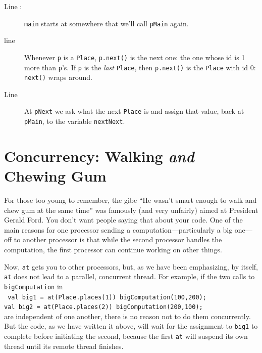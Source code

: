 \begin{description}
\item[Line :] 
{\tt main} starts at somewhere that we'll call {\tt pMain} again.    
\item[line ] 
Whenever {\tt p} is a {\tt Place}, 
{\tt p.next()} is the next one: the one whose id is 1 more than {\tt p}'s.  If
{\tt p} is the {\em last} {\tt Place}, then {\tt p.next()} is the {\tt Place}
with id 0: {\tt next()} wraps around.

\item[Line ] At {\tt pNext} we ask what the next {\tt Place}
is and assign that value, back at {\tt pMain}, to the variable {\tt nextNext}.
\end{description}

\section{Concurrency: Walking {\em and} Chewing Gum}

For those too young to remember, the gibe ``He wasn't smart enough to walk
and chew gum at the same time'' was famously (and very unfairly) aimed at
President Gerald Ford.  You don't want people saying that about your code.
One of the main reasons for one processor sending a computation---particularly
a big one---off to another processor is that while the second processor handles
the computation, the first processor can continue working on other things.
 
Now, {\tt at} gets you to other processors, but, as we have been
emphasizing, by itself, {\tt at}  does not lead to a parallel, concurrent thread.
For example, if the two calls to {\tt bigComputation} in\\
{\tt
\hspace*{2em}val big1 = at(Place.places(1)) bigComputation(100,200);\\ 
\hspace*{2em}val big2 = at(Place.places(2)) bigComputation(200,100);\\ 
}
are independent of one another, there is no reason not to do them 
concurrently.  But the code, as we have written it above, will wait for the
assignment to {\tt big1} to complete before initiating the second, because the
first {\tt at} will suspend its own thread until its remote thread finishes.  

